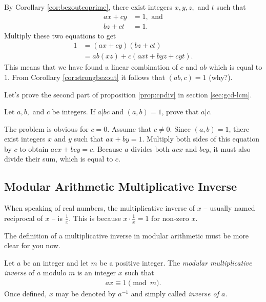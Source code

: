\documentclass{subfile}
\begin{document}
	\begin{solution}
		By Corollary \ref{cor:bezoutcoprime}, there exist integers $x,y,z,$ and $t$ such that
			\begin{align*}
				ax+cy&=1, \text{ and}\\
				bz+ct&=1.
			\end{align*}
		Multiply these two equations to get
			\begin{align*}
				1 &= (ax+cy)(bz+ct)\\
				  &= ab(xz)+c(axt+byz+cyt).
			\end{align*}
		This means that we have found a linear combination of $c$ and $ab$ which is equal to $1$. From Corollary \ref{cor:strongbezout} it follows that $(ab,c)=1$ (why?).
	\end{solution}
	
	Let's prove the second part of proposition \eqref{prop:cpdiv} in section \eqref{sec:gcd-lcm}.
	
	\begin{problem}\label{prob:a|bc}
		Let $a,b,$ and $c$ be integers. If $a|bc$ and $(a,b)=1$, prove that $a|c$.
	\end{problem}
	
	\begin{solution}
		The problem is obvious for $c=0$. Assume that $c \neq 0$. Since $(a,b)=1$, there exist integers $x$ and $y$ such that $ax+by=1$. Multiply both sides of this equation by $c$ to obtain $acx+bcy=c$. Because $a$ divides both $acx$ and $bcy$, it must also divide their sum, which is equal to $c$.
		 
	\end{solution}
	
	\subsection{Modular Arithmetic Multiplicative Inverse}\label{sec:arithinverse}
	
	When speaking of real numbers, the multiplicative inverse of $x$ -- usually named reciprocal of $x$ -- is $\frac{1}{x}$. This is because $x \cdot \frac{1}{x} = 1$ for non-zero $x$.
	
	The definition of a multiplicative inverse in modular arithmetic must be more clear for you now.
	
	\begin{definition}
		Let $a$ be an integer and let $m$ be a positive integer. The \textit{modular multiplicative inverse} of $a$ modulo $m$ is an integer $x$ such that
		\begin{align*}
		ax \equiv 1 \pmod m.
		\end{align*}
		Once defined, $x$ may be denoted by $a^{-1}$ and simply called \textit{inverse of $a$}.
	\end{definition}
	
\end{document}
